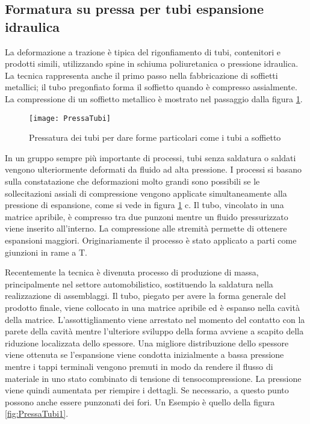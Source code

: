 \begin{figure}
\centering
{}\quad
{}\quad
{}
\end{figure}

\subsection{Formatura su pressa per tubi espansione idraulica}
La deformazione a trazione è tipica del rigonfiamento di tubi, contenitori e prodotti simili,
utilizzando spine in schiuma poliuretanica o pressione idraulica.
La tecnica rappresenta anche il primo passo nella fabbricazione di soffietti metallici; il tubo pregonfiato forma il soffietto quando è compresso assialmente. La compressione di un soffietto metallico è mostrato nel passaggio dalla figura \ref{fig:PressaTubi}.

\begin{figure}
\centering
\texttt{[image: PressaTubi]}
\caption{Pressatura dei tubi per dare forme particolari come i tubi a soffietto}
\label{fig:PressaTubi}
\end{figure}

In un gruppo sempre più importante di processi, tubi senza saldatura o saldati vengono ulteriormente deformati da fluido ad alta pressione. I processi si basano sulla constatazione che deformazioni molto grandi sono possibili se le sollecitazioni assiali di compressione vengono applicate simultaneamente alla pressione di espansione, come si vede in figura \ref{fig:PressaTubi} c.
Il tubo, vincolato in una matrice apribile, è compresso tra due punzoni mentre un fluido pressurizzato viene inserito all'interno. La compressione alle stremità permette di ottenere espansioni maggiori.
Originariamente il processo è stato applicato a parti come giunzioni in rame a T.

Recentemente la tecnica è divenuta processo di produzione di massa, principalmente nel
settore automobilistico, sostituendo la saldatura nella realizzazione di assemblaggi.
Il tubo, piegato per avere la forma generale del prodotto finale, viene collocato in una matrice
apribile ed è espanso nella cavità della matrice. L'assottigliamento viene arrestato nel
momento del contatto con la parete della cavità mentre l'ulteriore sviluppo della forma
avviene a scapito della riduzione localizzata dello spessore.
Una migliore distribuzione dello spessore viene ottenuta se l'espansione viene condotta
inizialmente a bassa pressione mentre i tappi terminali vengono premuti in modo da rendere
il flusso di materiale in uno stato combinato di tensione di tensocompressione. La pressione viene quindi aumentata per riempire i dettagli. Se necessario, a questo punto possono anche essere punzonati dei fori.
Un Esempio è quello della figura \ref{fig:PressaTubi1}.

